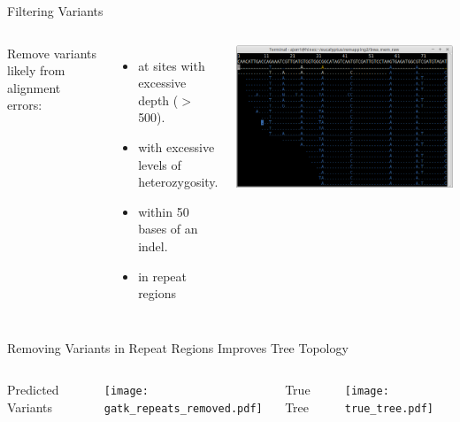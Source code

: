 \documentclass{beamer}
\begin{document}
\begin{frame}{Filtering Variants}
\begin{columns}
Remove variants likely from alignment errors:
\begin{itemize}
	\item at sites with excessive depth ($>$500).
	\item with excessive levels of heterozygosity.
	\item within 50 bases of an indel.
	\item in repeat regions 
\end{itemize}
\includegraphics[width=\linewidth]{coverage.png}
\end{columns}
\end{frame}


\begin{frame}{Removing Variants in Repeat Regions Improves Tree Topology}
	\begin{columns}
		\begin{center}
		Predicted Variants
		\end{center}
		\texttt{[image: gatk\_repeats\_removed.pdf]}
		\begin{center}
		True Tree
		\end{center}
		\texttt{[image: true\_tree.pdf]}
	\end{columns}
\end{frame}
\end{document}
